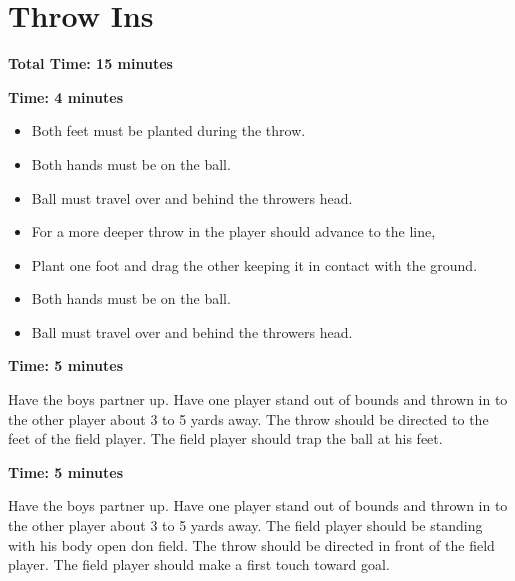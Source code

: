 \documentclass[10pt,letterpaper]{article}
\newenvironment{agendablock}[1]{%
    \tcolorbox[beamer,%
    noparskip,breakable,
    colback=LightGray,colframe=Black,%
    colbacklower=Gray!75!LightGray,%
    title=#1]}%
    {\endtcolorbox}
\newenvironment{evenBlock}[1]{%
    \tcolorbox[beamer,%
    noparskip,breakable,
    colback=LightGreen,colframe=DarkGreen,%
    colbacklower=LimeGreen!75!LightGreen,%
    title=#1]}%
    {\endtcolorbox}
\newenvironment{oddBlock}[1]{%
    \tcolorbox[beamer,%
    noparskip,breakable,
    colback=LightBlue,colframe=DarkBlue,%
    colbacklower=DarkBlue!75!LightBlue,%
    title=#1]}%
    {\endtcolorbox}
\begin{document}
\section{Throw Ins}
\textbf{Total Time: 15 minutes}

\textbf{Time: 4 minutes}
\begin{agendablock}{HOWTO: Basic Throw In:}
\begin{itemize}
    \setlength{\itemsep}{0pt}
    \setlength{\parskip}{0pt}
    \setlength{\parsep}{0pt}
    \item Both feet must be planted during the throw.
    \item Both hands must be on the ball.
    \item Ball must travel over and behind the throwers head.
\end{itemize}
\end{agendablock}

\begin{agendablock}{HOWTO: Deep Throw In:}
\begin{itemize}
    \setlength{\itemsep}{0pt}
    \setlength{\parskip}{0pt}
    \setlength{\parsep}{0pt}
    \item For a more deeper throw in the player should advance to the line,
    \item Plant one foot and drag the other keeping it in contact with the ground.
    \item Both hands must be on the ball.
    \item Ball must travel over and behind the throwers head.
\end{itemize}
\end{agendablock}

\textbf{Time: 5 minutes}
\begin{evenBlock}{Throw-In to Feet}

    Have the boys partner up.  Have one player stand out of bounds and thrown in to the other player about 3 to 5 yards away.  The throw should be directed to the feet of the field player.  The field player should trap the ball at his feet.

\end{evenBlock}

\textbf{Time: 5 minutes}
\begin{oddBlock}{Throw-In leading field player}

    Have the boys partner up.  Have one player stand out of bounds and thrown in to the other player about 3 to 5 yards away.  The field player should be standing with his body open don field.  The throw should be directed in front of the field player. The field  player should make a first touch toward goal.
\end{oddBlock}
\end{document}
